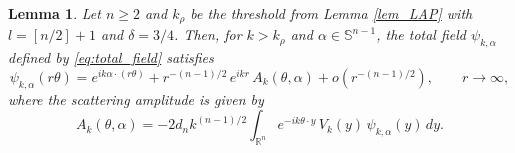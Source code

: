 \documentclass[12pt,a4paper]{amsart}
\numberwithin{equation}{section}
\theoremstyle{plain}
\newtheorem{lemma}[theorem]{Lemma}
\theoremstyle{definition}
\begin{document}
\begin{lemma}\label{lem:farfield_expansion}
Let $n \geq 2$ and $k_\rho$ be the threshold from Lemma \ref{lem_LAP} with $l=[n/2]+1$ and $\delta=3/4$. Then, for $k > k_\rho$ and
$\alpha \in \mathbb{S}^{n-1}$,
the total field $\psi_{k,\alpha}$ defined by \eqref{eq:total_field}
satisfies
\begin{equation}\label{eq:farfield_lemma}
\psi_{k,\alpha}(r\theta)
=
e^{ik\alpha \cdot (r\theta)}
+
r^{-(n-1)/2}\, e^{ikr}\, A_k(\theta,\alpha)
+
o(r^{-(n-1)/2}),
\qquad r\to\infty,
\end{equation}
where the scattering amplitude is given by
\begin{equation}\label{eq:amplitude}
A_k(\theta,\alpha)
=
-2d_n k^{(n-1)/2}
\int_{\mathbb{R}^n}
e^{-ik\theta\cdot y}\,
V_k(y)\,
\psi_{k,\alpha}(y)\,dy.
\end{equation}
\end{lemma}
\end{document}
